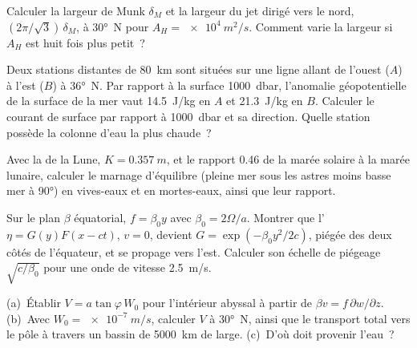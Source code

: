 \begin{exercise}[$\star\star$]\label{exo:b3:ocean-dynamics:7}
Calculer la largeur de Munk $\delta_M$ et la largeur du jet dirigé vers le nord,
$(2\pi/\sqrt3)\,\delta_M$, à \ang{30}~N pour $A_H = \qty{e4}{m^2/s}$. Comment
varie la largeur si $A_H$ est huit fois plus petit~?
\end{exercise}

\begin{exercise}[$\star\star$]\label{exo:b3:ocean-dynamics:8}
Deux stations distantes de \qty{80}{km} sont situées sur une ligne allant de l'ouest ($A$) à
l'est ($B$) à \ang{36}~N. Par rapport à la surface \qty{1000}{dbar}, l'anomalie
géopotentielle de la surface de la mer vaut \qty{14.5}{J/kg} en $A$ et
\qty{21.3}{J/kg} en $B$. Calculer le courant de surface par rapport à
\qty{1000}{dbar} et sa direction. Quelle station possède la colonne d'eau
la plus chaude~?
\end{exercise}

\begin{exercise}[$\star\star$]\label{exo:b3:ocean-dynamics:9}
Avec la  de la Lune, $K = \qty{0.357}{m}$, et le rapport
\num{0.46} de la marée solaire à la marée lunaire, calculer le marnage d'équilibre
(pleine mer sous les astres moins basse mer à \ang{90}) en vives-eaux et
en mortes-eaux, ainsi que leur rapport.
\end{exercise}

\begin{exercise}[$\star\star\star$]\label{exo:b3:ocean-dynamics:10}
Sur le plan $\beta$ équatorial, $f = \beta_0y$ avec $\beta_0 =
2\Omega/a$. Montrer que l' $\eta = G(y)F(x - ct)$, $v = 0$,
devient $G = \exp(-\beta_0y^2/2c)$, piégée des deux côtés de l'équateur,
et se propage vers l'est. Calculer son échelle de piégeage $\sqrt{c/\beta_0}$ pour une
onde de vitesse \qty{2.5}{m/s}.
\end{exercise}

\begin{exercise}[$\star\star\star$]\label{exo:b3:ocean-dynamics:11}
(a)~Établir $V = a\tan\varphi\,W_0$ pour l'intérieur abyssal à partir de $\beta v =
f\,\partial w/\partial z$. (b)~Avec $W_0 = \qty{e-7}{m/s}$, calculer $V$ à
\ang{30}~N, ainsi que le transport total vers le pôle à travers un bassin
de \qty{5000}{km} de large. (c)~D'où doit provenir l'eau~?
\end{exercise}

